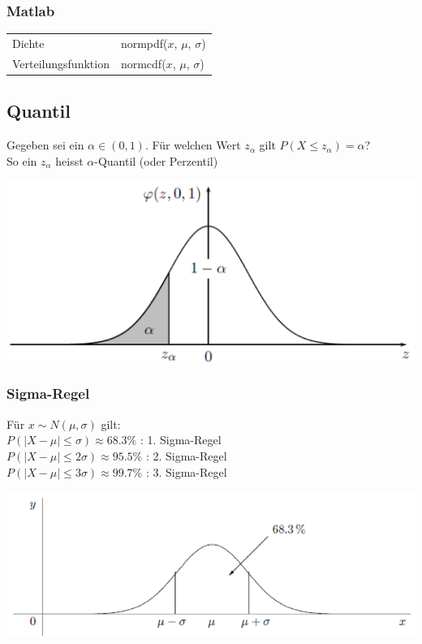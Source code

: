 \documentclass[10pt]{article}
\newtheorem[M]{definition}{Def.}
\newtheorem[M]{satz}{Satz}
\numberwithin{equation}{section}
\begin{document}
\subsubsection{Matlab}
\begin{tabular}{l l}
	Dichte & normpdf($x$, $\mu$, $\sigma$) \\
	Verteilungsfunktion & normcdf($x$, $\mu$, $\sigma$) \\
\end{tabular}

\subsection{Quantil}
\begin{definition}[Quantil]
Gegeben sei ein $\alpha\in (0,1)$. Für welchen Wert $z_\alpha$ gilt $P(X \leq z_\alpha)=\alpha$? \\
So ein $z_\alpha$ heisst $\alpha$-Quantil (oder Perzentil)
\end{definition}
\begin{center}
	\includegraphics[scale=0.4]{quantil.png}
\end{center}
\subsubsection{Sigma-Regel}
Für $x \sim N(\mu,\sigma)$ gilt: \\
$P(\mid X - \mu \mid \leq \sigma) \approx 68.3\%$ : 1. Sigma-Regel \\
$P(\mid X - \mu \mid \leq 2\sigma) \approx 95.5\%$ : 2. Sigma-Regel \\
$P(\mid X - \mu \mid \leq 3\sigma) \approx 99.7\%$ : 3. Sigma-Regel
\begin{center}
	\includegraphics[scale=0.4]{sigma-regel.png}
\end{center}
\end{document}
